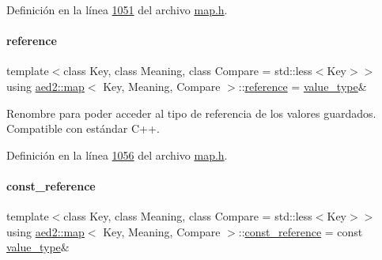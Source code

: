 Definición en la línea \hyperlink{map_8h_source_l01051}{1051} del archivo \hyperlink{map_8h_source}{map.\+h}.

\mbox{\label{classaed2_1_1map_af4f147533b3c0207ab036c86ce13ec0d_af4f147533b3c0207ab036c86ce13ec0d}} 
\paragraph{\texorpdfstring{reference}{reference}}
{\footnotesize\ttfamily template$<$class Key, class Meaning, class Compare = std\+::less$<$\+Key$>$$>$ \\
using \hyperlink{classaed2_1_1map}{aed2\+::map}$<$ Key, Meaning, Compare $>$\+::\hyperlink{classaed2_1_1map_af4f147533b3c0207ab036c86ce13ec0d_af4f147533b3c0207ab036c86ce13ec0d}{reference} =  \hyperlink{classaed2_1_1map_a719db98e0ff9a837610f76be33264680_a719db98e0ff9a837610f76be33264680}{value\+\_\+type}\&}



Renombre para poder acceder al tipo de referencia de los valores guardados. Compatible con estándar C++. 



Definición en la línea \hyperlink{map_8h_source_l01056}{1056} del archivo \hyperlink{map_8h_source}{map.\+h}.

\mbox{\label{classaed2_1_1map_a277080d3db76f19df9319ecba16475a9_a277080d3db76f19df9319ecba16475a9}} 
\paragraph{\texorpdfstring{const\+\_\+reference}{const\_reference}}
{\footnotesize\ttfamily template$<$class Key, class Meaning, class Compare = std\+::less$<$\+Key$>$$>$ \\
using \hyperlink{classaed2_1_1map}{aed2\+::map}$<$ Key, Meaning, Compare $>$\+::\hyperlink{classaed2_1_1map_a277080d3db76f19df9319ecba16475a9_a277080d3db76f19df9319ecba16475a9}{const\+\_\+reference} =  const \hyperlink{classaed2_1_1map_a719db98e0ff9a837610f76be33264680_a719db98e0ff9a837610f76be33264680}{value\+\_\+type}\&}



